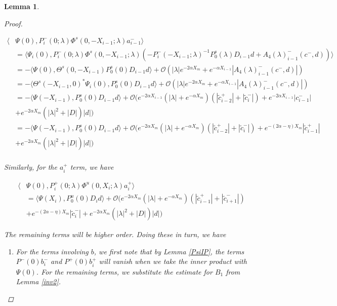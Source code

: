 \documentclass[12pt]{article}
\newtheorem{lemma}{Lemma}
\begin{document}
\begin{lemma}
\begin{proof}
\begin{enumerate}
\begin{align*}
\langle &\Psi(0), P_i^-(0; \lambda) \Phi^s(0, -X_{i-1}; \lambda) a_{i-1}^- \rangle \\
&= \langle \Psi_i(0), P_i^-(0; \lambda) \Phi^s(0, -X_{i-1}; \lambda) (- P_i^-(-X_{i-1}; \lambda)^{-1} P_0^s(\lambda) D_{i-1} d + A_4(\lambda)_{i-1}^-(c^-, d)) \rangle \\
&= -\langle \Psi(0), \Theta^s(0, -X_{i-1}) P_0^s(0) D_{i-1} d \rangle + \mathcal{O}( |\lambda|e^{-2 \alpha X_m} + e^{-\alpha X_{i-1}} |A_4(\lambda)_{i-1}^-(c^-, d)|)\\
&= -\langle \Theta^s(-X_{i-1}, 0)^* \Psi_i(0), P_0^s(0) D_{i-1} d \rangle + \mathcal{O}( |\lambda|e^{-2 \alpha X_m} + e^{-\alpha X_{i-1}} |A_4(\lambda)_{i-1}^-(c^-, d)|)\\
&= -\langle \Psi(-X_{i-1}), P_0^s(0) D_{i-1} d \rangle + \mathcal{O}\Big(  
e^{-2\alpha X_{i-1}} (|\lambda| + e^{-\alpha X_m})(|\tilde{c}_{i-2}^+| + |\tilde{c}_i^-|) + e^{-2\alpha X_{i-1}} |c_{i-1}^-| \\
&+ e^{-2 \alpha X_m}(|\lambda|^2 + |D|)|d| \Big) \\
&= -\langle \Psi(-X_{i-1}), P_0^s(0) D_{i-1} d \rangle 
+ \mathcal{O}\Big(  
e^{-2\alpha X_m} (|\lambda| + e^{-\alpha X_m})(|\tilde{c}_{i-2}^+| + |\tilde{c}_i^-|) + e^{-(2\alpha-\eta) X_m} |\tilde{c}_{i-1}^+| \\
&+ e^{-2 \alpha X_m}(|\lambda|^2 + |D|)|d| \Big) \\
\end{align*}

Similarly, for the $a_i^+$ term, we have

\begin{align*}
\langle &\Psi(0), P_i^+(0; \lambda) \Phi^u(0, X_i; \lambda) a_i^+ \rangle \\
&= \langle \Psi(X_i), P_0^u(0) D_i d \rangle + \mathcal{O}\Big( e^{-2 \alpha X_m} (|\lambda| + e^{-\alpha X_m})(|\tilde{c}_{i-1}^+| + |\tilde{c}_{i+1}^-|) \\
&+ e^{-(2 \alpha - \eta) X_m} |\tilde{c}_i^-| + e^{-2 \alpha X_m}(|\lambda|^2 + |D|)|d| \Big)
\end{align*}

\end{enumerate}

The remaining terms will be higher order. Doing these in turn, we have

\begin{enumerate}
\item For the terms involving $b$, we first note that by Lemma \ref{PsiIP}, the terms $P^-(0) b_i^-$ and $P^+(0)b_i^+$ will vanish when we take the inner product with $\Psi(0)$. For the remaining terms, we substitute the estimate for $B_1$ from Lemma \ref{inv2}.


\end{enumerate}
\end{proof}
\end{lemma}
\end{document}
